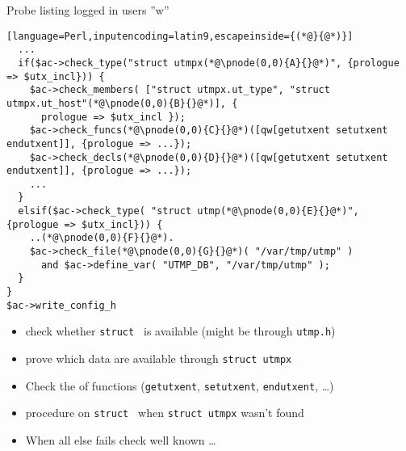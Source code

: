\documentclass[ngerman,xcolor={table,dvipsnames},smaller,compress,hyperref={bookmarks,colorlinks}]{beamer}%
\begin{document}
\begin{frame}[fragile]{Probe listing logged in users ''w''}
\begin{block}{}
\scriptsize
\begin{lstlisting}[language=Perl,inputencoding=latin9,escapeinside={(*@}{@*)}]
  ...
  if($ac->check_type("struct utmpx(*@\pnode(0,0){A}{}@*)", {prologue => $utx_incl})) {
    $ac->check_members( ["struct utmpx.ut_type", "struct utmpx.ut_host"(*@\pnode(0,0){B}{}@*)], {
      prologue => $utx_incl });
    $ac->check_funcs(*@\pnode(0,0){C}{}@*)([qw[getutxent setutxent endutxent]], {prologue => ...});
    $ac->check_decls(*@\pnode(0,0){D}{}@*)([qw[getutxent setutxent endutxent]], {prologue => ...});
    ...
  }
  elsif($ac->check_type( "struct utmp(*@\pnode(0,0){E}{}@*)", {prologue => $utx_incl})) {
    ..(*@\pnode(0,0){F}{}@*).
    $ac->check_file(*@\pnode(0,0){G}{}@*)( "/var/tmp/utmp" )
      and $ac->define_var( "UTMP_DB", "/var/tmp/utmp" );
  }
}
$ac->write_config_h
\end{lstlisting}
\end{block} %

\begin{itemize}
\item<2-> check whether \texttt{struct } is available (might be through \texttt{utmp.h})

\item<3-> prove which data  are available through \texttt{struct utmpx}

\item<4-> Check the  of functions (\texttt{getutxent}, \texttt{setutxent}, \texttt{endutxent}, \ldots)

\item<6->  procedure on \texttt{struct } when \texttt{struct utmpx} wasn't found

\item<7-> When all else fails check well known  \ldots
{}

\end{itemize}
\end{frame}
\end{document}
